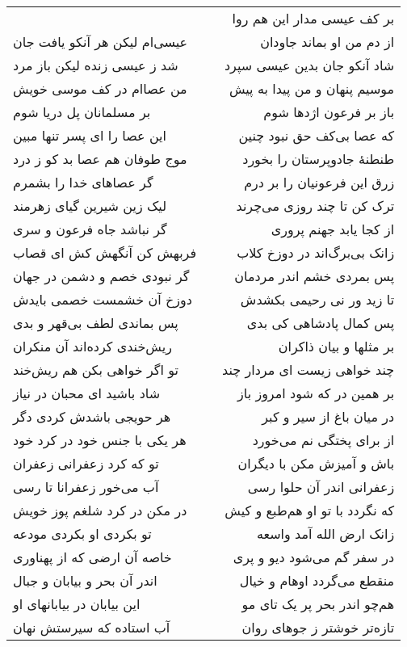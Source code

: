 \begin{center}
\begin{longtable}{l p{0.5cm} r}
&&
بر کف عیسی مدار این هم روا
\\
عیسی‌ام لیکن هر آنکو یافت جان
&&
از دم من او بماند جاودان
\\
شد ز عیسی زنده لیکن باز مرد
&&
شاد آنکو جان بدین عیسی سپرد
\\
من عصاام در کف موسی خویش
&&
موسیم پنهان و من پیدا به پیش
\\
بر مسلمانان پل دریا شوم
&&
باز بر فرعون اژدها شوم
\\
این عصا را ای پسر تنها مبین
&&
که عصا بی‌کف حق نبود چنین
\\
موج طوفان هم عصا بد کو ز درد
&&
طنطنهٔ جادوپرستان را بخورد
\\
گر عصاهای خدا را بشمرم
&&
زرق این فرعونیان را بر درم
\\
لیک زین شیرین گیای زهرمند
&&
ترک کن تا چند روزی می‌چرند
\\
گر نباشد جاه فرعون و سری
&&
از کجا یابد جهنم پروری
\\
فربهش کن آنگهش کش ای قصاب
&&
زانک بی‌برگ‌اند در دوزخ کلاب
\\
گر نبودی خصم و دشمن در جهان
&&
پس بمردی خشم اندر مردمان
\\
دوزخ آن خشمست خصمی بایدش
&&
تا زید ور نی رحیمی بکشدش
\\
پس بماندی لطف بی‌قهر و بدی
&&
پس کمال پادشاهی کی بدی
\\
ریش‌خندی کرده‌اند آن منکران
&&
بر مثلها و بیان ذاکران
\\
تو اگر خواهی بکن هم ریش‌خند
&&
چند خواهی زیست ای مردار چند
\\
شاد باشید ای محبان در نیاز
&&
بر همین در که شود امروز باز
\\
هر حویجی باشدش کردی دگر
&&
در میان باغ از سیر و کبر
\\
هر یکی با جنس خود در کرد خود
&&
از برای پختگی نم می‌خورد
\\
تو که کرد زعفرانی زعفران
&&
باش و آمیزش مکن با دیگران
\\
آب می‌خور زعفرانا تا رسی
&&
زعفرانی اندر آن حلوا رسی
\\
در مکن در کرد شلغم پوز خویش
&&
که نگردد با تو او هم‌طبع و کیش
\\
تو بکردی او بکردی مودعه
&&
زانک ارض الله آمد واسعه
\\
خاصه آن ارضی که از پهناوری
&&
در سفر گم می‌شود دیو و پری
\\
اندر آن بحر و بیابان و جبال
&&
منقطع می‌گردد اوهام و خیال
\\
این بیابان در بیابانهای او
&&
هم‌چو اندر بحر پر یک تای مو
\\
آب استاده که سیرستش نهان
&&
تازه‌تر خوشتر ز جوهای روان
\\

\end{longtable}
\end{center}
